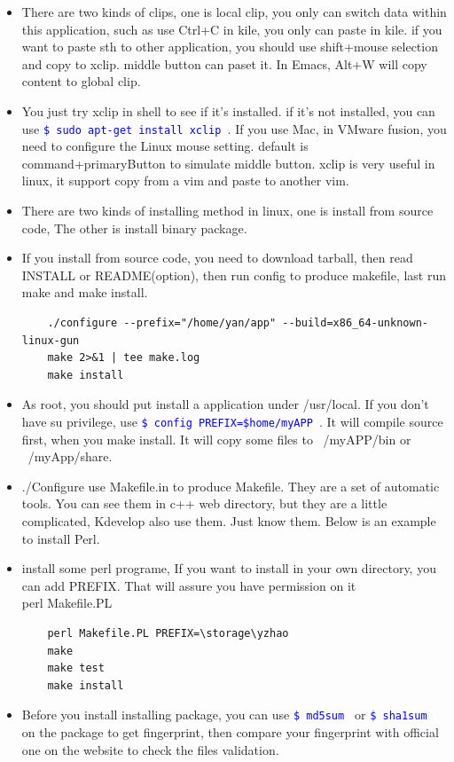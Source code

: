 \documentclass[a4paper,12pt,twoside]{book}
\newcommand{\linuxcommand}[1]{\texttt{\textcolor{blue}{\$ #1 \Pisymbol{psy}{191}}}}
\begin{document}
	\begin{itemize}
	\item There are two kinds of clips, one is local clip, you only can switch data within this application, such as use Ctrl+C in kile, you only can paste in kile. if you want to paste sth to other application, you should use shift+mouse selection and copy to xclip. middle button can paset it. In Emacs, Alt+W will copy content to global clip.
	\item You just try xclip in shell to see if it's installed. if it's not installed, you can use \linuxcommand{sudo apt-get install xclip}. If you use Mac, in VMware fusion, you need to configure the Linux mouse setting.  default is command+primaryButton to simulate middle button.  xclip is very useful in linux, it support copy from a vim and paste to another vim.  
	\item There are two kinds of installing method in linux, one is install from source code, The other is install binary package.
    \item If you install from source code, you need to download tarball, then read
        INSTALL or README(option), then run config to produce makefile, last run make
        and make install.
         \begin{verbatim}
	./configure --prefix="/home/yan/app" --build=x86_64-unknown-linux-gun 
	make 2>&1 | tee make.log
	make install 
    \end{verbatim}
     \item As root, you should put install a application under /usr/local. If you don't have
         su privilege, use \linuxcommand{config PREFIX=\$home/myAPP}.  It will compile
         source first, when you make install. It will copy some files to ~/myAPP/bin or
         ~/myApp/share.
     \item./Configure use Makefile.in to produce Makefile. They are a set of automatic
         tools. You can see them in c++ web directory, but they are a little complicated,
         Kdevelop also use them.  Just know them.  Below is an example to install Perl.
	 \item install some perl programe, If you want to install in your own directory, you can add PREFIX. That will assure you have permission on it \\
  	 perl Makefile.PL
    \begin{verbatim}
    perl Makefile.PL PREFIX=\storage\yzhao
    make
    make test
    make install
    \end{verbatim}
	\item Before you install installing package, you can use \linuxcommand{md5sum} or \linuxcommand{sha1sum} on the package to get fingerprint, then compare your fingerprint with official one on the
website to check the files validation.


\end{itemize}
\end{document}
